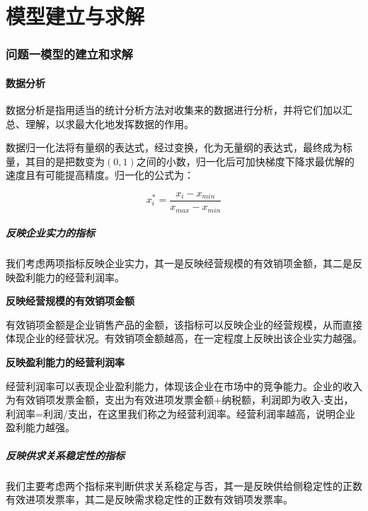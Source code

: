 \ifx\allfiles\undefined


\else
\fi


\part{模型建立与求解}
\section{问题一模型的建立和求解}
\subsection{数据分析}

数据分析是指用适当的统计分析方法\cite{ref2}对收集来的数据进行分析，并将它们加以汇总、理解，以求最大化地发挥数据的作用。

数据归一化法将有量纲的表达式，经过变换，化为无量纲的表达式，最终成为标量，其目的是把数变为$ (0,1) $之间的小数，归一化后可加快梯度下降求最优解的速度且有可能提高精度。归一化的公式为：

\[x^{*}_{i}=\frac{x_{i}-x_{min}}{x_{max}-x_{min}}\]

\subsubsection{反映企业实力的指标}

我们考虑两项指标反映企业实力，其一是反映经营规模的有效销项金额，其二是反映盈利能力的经营利润率。

\noindent \textbf{{\large 反映经营规模的有效销项金额}}

有效销项金额是企业销售产品的金额，该指标可以反映企业的经营规模，从而直接体现企业的经营状况。有效销项金额越高，在一定程度上反映出该企业实力越强。



\noindent \textbf{{\large 反映盈利能力的经营利润率}}

经营利润率可以表现企业盈利能力，体现该企业在市场中的竞争能力。企业的收入为有效销项发票金额，支出为有效进项发票金额+纳税额，利润即为收入-支出，利润率=利润/支出，在这里我们称之为经营利润率。经营利润率越高，说明企业盈利能力越强。



\subsubsection{反映供求关系稳定性的指标}

我们主要考虑两个指标来判断供求关系稳定与否，其一是反映供给侧稳定性的正数有效进项发票率，其二是反映需求稳定性的正数有效销项发票率。



